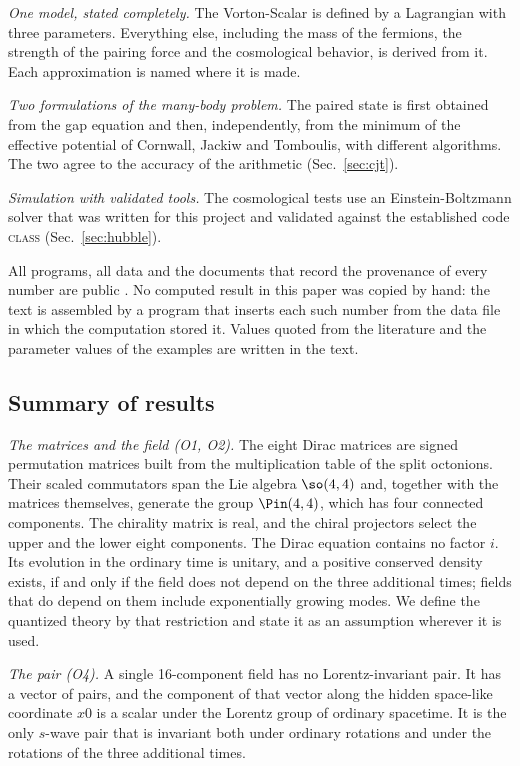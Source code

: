 \emph{One model, stated completely.} The Vorton-Scalar is defined by a Lagrangian with three
parameters. Everything else, including the mass of the fermions, the strength of the pairing force and
the cosmological behavior, is derived from it. Each approximation is named where it is made.

\emph{Two formulations of the many-body problem.} The paired state is first obtained from the gap
equation and then, independently, from the minimum of the effective potential of Cornwall, Jackiw and
Tomboulis, with different algorithms. The two agree to the accuracy of the arithmetic
(Sec.~\ref{sec:cjt}).

\emph{Simulation with validated tools.} The cosmological tests use an Einstein-Boltzmann solver that was
written for this project and validated against the established code \textsc{class}
\cite{BlasLesgourguesTram2011} (Sec.~\ref{sec:hubble}).

All programs, all data and the documents that record the provenance of every number are public
\cite{SpacetimesRepo}. No computed result in this paper was copied by hand: the text is assembled by
a program that inserts each such number from the data file in which the computation stored it. Values
quoted from the literature and the parameter values of the examples are written in the text.

\subsection{Summary of results}

\emph{The matrices and the field (O1, O2).} The eight Dirac matrices are signed permutation matrices
built from the multiplication table of the split octonions. Their scaled commutators span the Lie
algebra $\so(4,4)$ and, together with the matrices themselves, generate the group $\Pin(4,4)$, which
has four connected components. The chirality matrix is real, and the chiral projectors select the
upper and the lower eight components. The Dirac equation contains no factor $i$. Its evolution in the
ordinary time is unitary, and a positive conserved density exists, if and only if the field does not
depend on the three additional times; fields that do depend on them include exponentially growing
modes. We define the quantized theory by that restriction and state it as an assumption wherever it is
used.

\emph{The pair (O4).} A single 16-component field has no Lorentz-invariant pair. It has a vector of
pairs, and the component of that vector along the hidden space-like coordinate $x0$ is a scalar under
the Lorentz group of ordinary spacetime. It is the only $s$-wave pair that is invariant both under
ordinary rotations and under the rotations of the three additional times.

